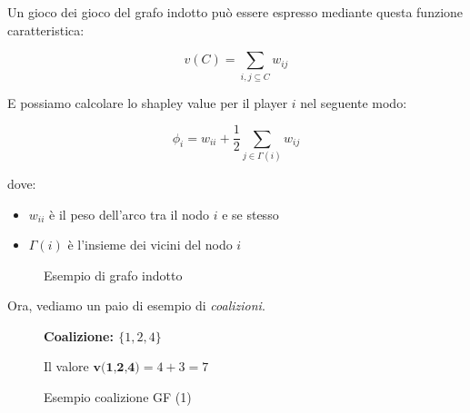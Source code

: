 Un gioco dei gioco del grafo indotto può essere espresso mediante questa
funzione caratteristica:

\[
    v(C) = \sum_{i,j \subseteq C} w_{ij}
\]

E possiamo calcolare lo shapley value per il player $i$ nel seguente modo:

\[
    \phi_i = w_{ii} + \frac{1}{2} \sum_{j \in \Gamma(i)} w_{ij}
\]

dove:
\begin{itemize}
    \item $w_{ii}$ è il peso dell'arco tra il nodo $i$ e se stesso
    \item $\Gamma(i)$ è l'insieme dei vicini del nodo $i$
\end{itemize}

\begin{figure}[H]
    \begin{center}
    \end{center}
    \caption{Esempio di grafo indotto}
\end{figure}

Ora, vediamo un paio di esempio di \textit{coalizioni}.

\begin{esempio}
\end{esempio}

\begin{figure}[H]
    \begin{center}
        \textbf{Coalizione: $\{1,2,4\}$}

        Il valore $\textbf{v(1,2,4)} = 4 + 3 = 7$


    \end{center}
    \caption{Esempio coalizione GF (1)}
\end{figure}

